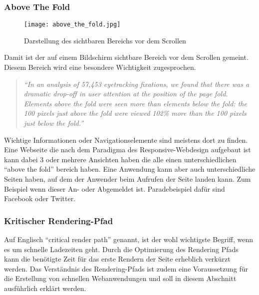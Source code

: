 		\subsubsection{Above The Fold} %
		\label{ssub:above_the_fold}
			\begin{figure}[htbp]
				\begin{center}
					\texttt{[image: above\_the\_fold.jpg]}
					\caption{Darstellung des sichtbaren Bereichs vor dem Scrollen}
					\label{fig:above_the_fold}
				\end{center}
			\end{figure}
			
			Damit ist der auf einem Bildschirm sichtbare Bereich vor dem Scrollen gemeint. Diesem Bereich wird eine besondere Wichtigkeit zugesprochen.

			\begin{quote}
				 \textit{"`In an analysis of 57,453 eyetracking fixations, we found that there was a dramatic drop-off in user attention at the position of the page fold. Elements above the fold were seen more than elements below the fold: the 100 pixels just above the fold were viewed 102\% more than the 100 pixels just below the fold."'} \autocite{nng15}
			\end{quote}

			Wichtige Informationen oder Navigationselemente sind meistens dort zu finden. Eine Webseite die nach dem Paradigma des Responsive-Webdesign aufgebaut ist kann dabei 3 oder mehrere Ansichten haben die alle einen unterschiedlichen "`above the fold"' bereich haben. Eine Anwendung kann aber auch unterschiedliche Seiten haben, auf dem der Anwender beim Aufrufen der Seite landen kann. Zum Beispiel wenn dieser An- oder Abgemeldet ist. Paradebeispiel dafür sind Facebook oder Twitter.

		\subsubsection{Kritischer Rendering-Pfad} %
		\label{ssub:critical_render_path}
			Auf Englisch "`critical render path"' genannt, ist der wohl wichtigste Begriff, wenn es um schnelle Ladezeiten geht. Durch die Optimierung des Rendering Pfads kann die benötigte Zeit für das erste Rendern der Seite erheblich verkürzt werden. Das Verständnis des Rendering-Pfads ist zudem eine Voraussetzung für die Erstellung von schnellen Webanwendungen und soll in diesem Abschnitt ausführlich erklärt werden.\\

